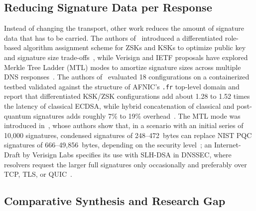 \documentclass[conference]{IEEEtran}
\begin{document}
\subsection{Reducing Signature Data per Response}
\label{sec:rw-size}

Instead of changing the transport, other work reduces the amount of signature
data that has to be carried. The authors of~\cite{differentiated} introduced a
differentiated role-based algorithm assignment scheme for ZSKs and KSKs to
optimize public key and signature size trade-offs~\cite{differentiated}, while
Verisign and IETF proposals have explored Merkle Tree Ladder (MTL) modes to
amortize signature sizes across multiple DNS responses~\cite{mtldraft}. The
authors of~\cite{differentiated} evaluated 18 configurations on a
containerized testbed validated against the structure of AFNIC's \texttt{.fr}
top-level domain and report that differentiated KSK/ZSK configurations add
about 1.28 to 1.52 times the latency of classical ECDSA, while hybrid
concatenation of classical and post-quantum signatures adds roughly 7\% to
19\% overhead~\cite{differentiated}. The MTL mode was introduced
in~\cite{mtl}, whose authors show that, in a scenario with an initial series of
10,000 signatures, condensed signatures of 248--472~bytes can replace NIST PQC
signatures of 666--49,856~bytes, depending on the security level~\cite{mtl};
an Internet-Draft by Verisign Labs specifies its use with SLH-DSA in DNSSEC,
where resolvers request the larger full signatures only occasionally and
preferably over TCP, TLS, or QUIC~\cite{mtldraft}.

\subsection{Comparative Synthesis and Research Gap}
\label{sec:rw-synthesis}
\end{document}
